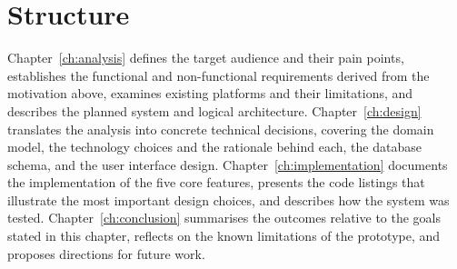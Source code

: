 \section{Structure}
\label{sec:structure}

Chapter~\ref{ch:analysis} defines the target audience and their pain points, establishes the
functional and non-functional requirements derived from the motivation above, examines existing
platforms and their limitations, and describes the planned system and logical architecture.
Chapter~\ref{ch:design} translates the analysis into concrete technical decisions, covering the
domain model, the technology choices and the rationale behind each, the database schema, and the
user interface design.
Chapter~\ref{ch:implementation} documents the implementation of the five core features, presents
the code listings that illustrate the most important design choices, and describes how the system
was tested.
Chapter~\ref{ch:conclusion} summarises the outcomes relative to the goals stated in this chapter,
reflects on the known limitations of the prototype, and proposes directions for future work.
